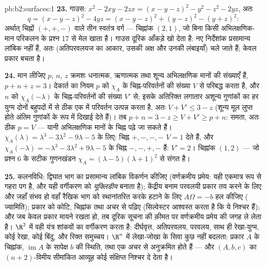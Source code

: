 \begin{solution}{pb:b2:surfaces:1}
\textbf{23.} गाउस: $x^2 - 2xy - 2zx = (x - y - z)^2 - y^2 -
z^2 - 2yz$, अतः
\[
q = (x - y - z)^2 - 4yz = (x - y - z)^2 + (y - z)^2 - (y +
z)^2 :
\]
अर्थात् चिह्नों $(+, +, -)$ वाले तीन स्वतंत्र वर्ग --- चिह्नांक $(2, 1)$, जो
बिना किसी अभिलक्षणिक-मान परिकलन के प्रश्न 17 से मेल खाता है।
गाउस दूरिक आँकड़े खो देता है: नए निर्देशांक प्रसामान्य लांबिक नहीं
हैं, अतः  (अतिपरवलयज का आकार, उसकी अक्ष और उनकी
लंबाइयाँ) चले जाते हैं; केवल  प्रकार बचता है।

\textbf{24.} मान लीजिए $p$, $n$, $z$ क्रमशः धनात्मक, ऋणात्मक
तथा शून्य अभिलक्षणिक मानों की संख्याएँ हैं, $p + n + z = 3$। देकार्त का नियम
$p$ को $\chi_A$ के चिह्न-परिवर्तनों की संख्या $V$ से परिबद्ध करता
है, और $n$ को $\chi_A(-\lambda)$ के चिह्न-परिवर्तनों की संख्या $V'$ से; इसके
अतिरिक्त लगातार अशून्य गुणांकों का हर युग्म दोनों बहुपदों में से
ठीक एक में परिवर्तन उत्पन्न करता है, अतः $V + V' \leq 3 - z$ (शून्य मूल लुप्त
होते अंतिम गुणांकों के रूप में दिखाई देते हैं)। तब $p + n = 3 - z \geq
V + V' \geq p + n$: समता, अतः
ठीक $p = V$ --- यानी अभिलक्षणिक मानों के चिह्न पढ़े जा सकते हैं। $\chi_A(\lambda)
= \lambda^3 - 3\lambda^2 - 9\lambda - 5$
के लिए: चिह्न $+,-,-,-$ $V = 1$ देते हैं, और $\chi_A(-\lambda) = -\lambda^3 - 3\lambda^2
+ 9\lambda - 5$ के चिह्न $-,-,+,-$ हैं:
$V' = 2$। चिह्नांक $(1,
2)$ --- जो प्रश्न 6 के सटीक गुणनखंडन $\chi_A =
(\lambda - 5)(\lambda + 1)^2$ से
संगत है।

\textbf{25.} कलनविधि: द्विघात भाग का प्रसामान्य लांबिक विकर्णन
कीजिए (वर्णक्रमीय प्रमेय: यही एकमात्र  रूप से गहरा पग है,
और यही वर्गीकरण को \emph{यूक्लिडीय} बनाता है); केंद्रीय बनाम
परवलयी प्रकार तय करने के लिए और जहाँ संभव हो वहाँ रैखिक भाग को
स्थानांतरित करके हटाने के लिए $A\Omega = -b$ हल कीजिए ( ज्यामिति); प्रकार
को कोटि, चिह्नांक तथा अचर से पढ़िए (सिल्वेस्टर आश्वस्त करता है कि
ये निश्चर हैं); और जब केवल  प्रकार मायने रखता हो, तब  दूरिक सूचना की क़ीमत पर वर्णक्रमीय प्रमेय की जगह ले लेता
है। $\R^2$ में वही यंत्र शांकवों का वर्गीकरण करता है: दीर्घवृत्त,
अतिपरवलय, परवलय, साथ ही रेखा-युग्म, कोई रेखा, कोई बिंदु, और रिक्त
समुच्चय। $\R^n$ में लेखा-जोखा के सिवा कुछ नहीं बदलता: प्रकार $A$ के
चिह्नांक, $\operatorname{im}A$ के सापेक्ष $b$ की स्थिति, तथा एक अचर से अनुक्रमित
होते हैं --- और $(A, b, c)$ का $(n{+}2)$-विमीय सीमांकित आव्यूह कोई संक्षिप्त
निश्चर दे देता है।
\end{solution}
